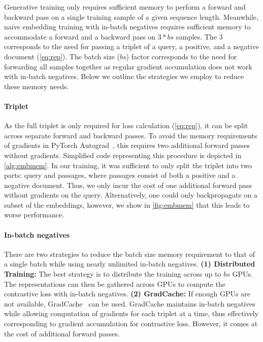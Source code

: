 \documentclass{article}
\begin{document}
Generative training only requires sufficient memory to perform a forward and backward pass on a single training sample of a given sequence length. Meanwhile, naive embedding training with in-batch negatives requires sufficient memory to accommodate a forward and a backward pass on $3 * bs$ samples. The $3$ corresponds to the need for passing a triplet of a query, a positive, and a negative document (\autoref{eq:rep}). The batch size ($bs$) factor corresponds to the need for forwarding all samples together as regular gradient accumulation does not work with in-batch negatives. Below we outline the strategies we employ to reduce these memory needs.

\paragraph{Triplet} As the full triplet is only required for loss calculation (\autoref{eq:rep}), it can be split across separate forward and backward passes. To avoid the memory requirements of gradients in PyTorch Autograd~\cite{paszke2019pytorch}, this requires two additional forward passes without gradients. Simplified code representing this procedure is depicted in \autoref{alg:embmem}. In our training, it was sufficient to only split the triplet into two parts: query and passages, where passages consist of both a positive and a negative document. Thus, we only incur the cost of one additional forward pass without gradients on the query. Alternatively, one could only backpropagate on a subset of the embeddings, however, we show in \autoref{fig:embmem} that this leads to worse performance.

\paragraph{In-batch negatives} There are two strategies to reduce the batch size memory requirement to that of a single batch while using nearly unlimited in-batch negatives. \textbf{(1) Distributed Training:} The best strategy is to distribute the training across up to $bs$ GPUs. The representations can then be gathered across GPUs to compute the contrastive loss with in-batch negatives. \textbf{(2) GradCache:} If enough GPUs are not available, GradCache~\cite{gao2021scaling} can be used. GradCache maintains in-batch negatives while allowing computation of gradients for each triplet at a time, thus effectively corresponding to gradient accumulation for contrastive loss. However, it comes at the cost of additional forward passes.
\end{document}
